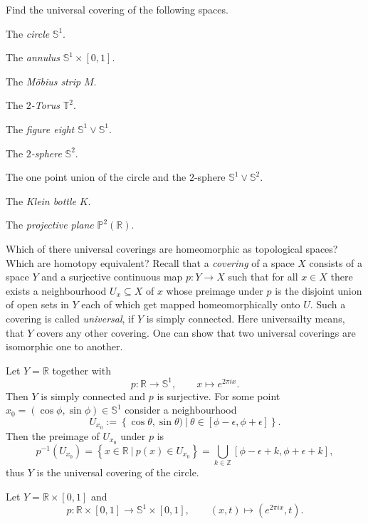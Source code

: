 \documentclass[11pt]{book}
\numberwithin{dummy}{section}
\theoremstyle{nonumberbreak}
\newenvironment{sol}[1][]{\ifthenelse{\equal{#1}{}}{\solution}{\solution[#1]}\rm}{\endsolution}
\newenvironment{prob}[1][]{\ifthenelse{\equal{#1}{}}{\problem}{\problem[#1]}\rm}{\endproblem}
\newcommand{\Sph}{\mathbb{S}}
\newcommand{\la}{\longrightarrow}
\begin{document}
\begin{spacing}{1.4}
\begin{prob}     %
Find the universal covering of the following spaces.
\begin{compactenum}
\item The \textit{circle} $\mathbb{S}^1$.
\item The \textit{annulus} $\mathbb{S}^1 \times [0,1]$.
\item The \textit{Möbius strip} $M$.
\item The $2$\textit{-Torus} $\mathbb{T}^2$.
\item The \textit{figure eight} $\mathbb{S}^1 \vee \mathbb{S}^1$.
\item The $2$\textit{-sphere} $\mathbb{S}^2$.
\item The one point union of the circle and the $2$-sphere $\mathbb{S}^1 \vee \mathbb{S}^2$.
\item The \textit{Klein bottle} $K$.
\item The \textit{projective plane} $\mathbb{P}^2(\mathbb{R})$.
\end{compactenum}
Which of there universal coverings are homeomorphic as topological spaces? Which are homotopy equivalent?
\begin{sol}
Recall that a \textit{covering} of a space $X$ consists of a space $Y$ and a surjective continuous map $p:Y \la X$ such that for all $x \in X$ there exists a neighbourhood $U_x \subseteq X$ of $x$ whose preimage under $p$ is the disjoint union of open sets in $Y$ each of which get mapped homeomorphically onto $U$. Such a covering is called \textit{universal}, if $Y$ is simply connected. Here universailty means, that $Y$ covers any other covering. One can show that two universal coverings are isomorphic one to another.
\begin{compactenum}
\item Let $Y= \mathbb{R}$ together with 
$$p: \mathbb{R} \la \mathbb{S}^1, \qquad x \mapsto e^{2\pi i x}.$$
Then $Y$ is simply connected and $p$ is surjective. For some point $x_0=(\cos \phi, \sin \phi) \in \Sph^1$ consider a neighbourhood
$$U_{x_0} := \left\{ \cos \theta, \sin \theta) \ \vert \ \theta \in [\phi- \epsilon, \phi + \epsilon]\right\}.$$
Then the preimage of $U_{x_0}$ under $p$ is 
$$p^{-1}(U_{x_0}) = \left\{ x \in \mathbb{R} \ \vert \ p(x) \in U_{x_0} \right\} = \bigcup_{k \in \mathbb{Z}} [\phi- \epsilon +k, \phi + \epsilon + k],$$
thus $Y$ is the universal covering of the circle.
\item Let $Y= \mathbb{R} \times [0,1]$ and
$$p: \mathbb{R} \times [0,1] \la \mathbb{S}^1 \times [0,1], \qquad (x,t) \mapsto (e^{2\pi i x}, t).$$

\end{compactenum}
\end{sol}
\end{prob}
\end{spacing}
\end{document}
